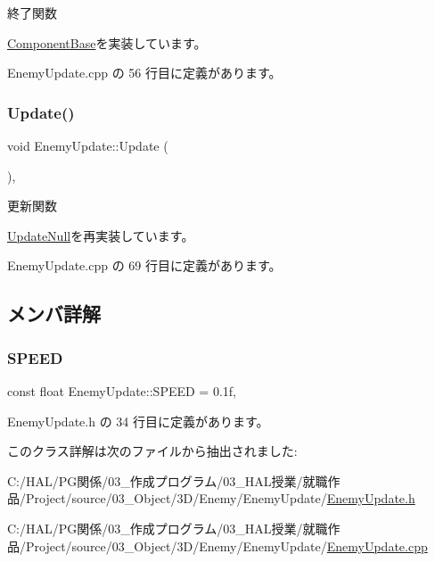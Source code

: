 終了関数 



\mbox{\hyperlink{class_component_base_a9f42beaf0383d6f629819579cab4de57}{Component\+Base}}を実装しています。



 Enemy\+Update.\+cpp の 56 行目に定義があります。

\mbox{\label{class_enemy_update_ae9662f3a2d064dc69c0d68293e60f051}} 
\subsubsection{\texorpdfstring{Update()}{Update()}}
{\footnotesize\ttfamily void Enemy\+Update\+::\+Update (\begin{DoxyParamCaption}{ }\end{DoxyParamCaption})\hspace{0.3cm}{\ttfamily [override]}, {\ttfamily [virtual]}}



更新関数 



\mbox{\hyperlink{class_update_null_a692f4f34e4ef35ca286a1d3606fdf473}{Update\+Null}}を再実装しています。



 Enemy\+Update.\+cpp の 69 行目に定義があります。



\subsection{メンバ詳解}
\mbox{\label{class_enemy_update_a339b9c72d3144781291bc333dc0c971f}} 
\subsubsection{\texorpdfstring{S\+P\+E\+ED}{SPEED}}
{\footnotesize\ttfamily const float Enemy\+Update\+::\+S\+P\+E\+ED = 0.\+1f\hspace{0.3cm}{\ttfamily [static]}, {\ttfamily [private]}}



 Enemy\+Update.\+h の 34 行目に定義があります。



このクラス詳解は次のファイルから抽出されました\+:\begin{DoxyCompactItemize}
\item 
C\+:/\+H\+A\+L/\+P\+G関係/03\+\_\+作成プログラム/03\+\_\+\+H\+A\+L授業/就職作品/\+Project/source/03\+\_\+\+Object/3\+D/\+Enemy/\+Enemy\+Update/\mbox{\hyperlink{_enemy_update_8h}{Enemy\+Update.\+h}}\item 
C\+:/\+H\+A\+L/\+P\+G関係/03\+\_\+作成プログラム/03\+\_\+\+H\+A\+L授業/就職作品/\+Project/source/03\+\_\+\+Object/3\+D/\+Enemy/\+Enemy\+Update/\mbox{\hyperlink{_enemy_update_8cpp}{Enemy\+Update.\+cpp}}\end{DoxyCompactItemize}
